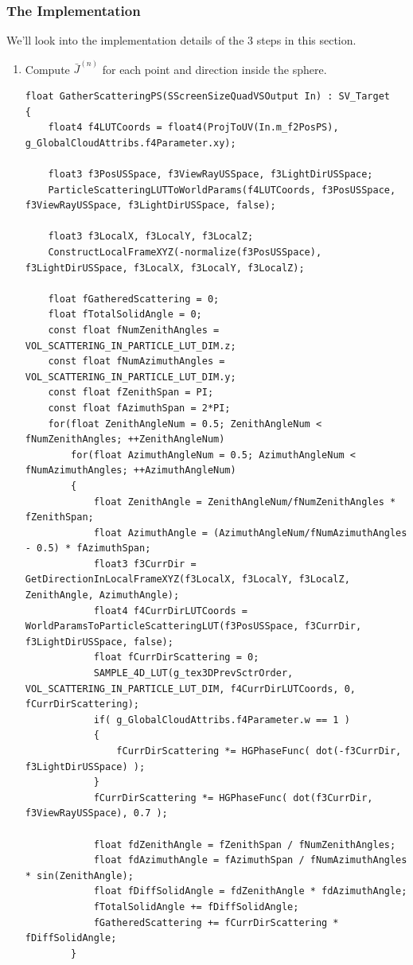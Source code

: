 \subsubsection{The Implementation}
We'll look into the implementation details of the 3 steps in this section.
\begin{enumerate}
\item Compute $\bar{J}^{(n)}$ for each point and direction inside the sphere.
\begin{lstlisting}
float GatherScatteringPS(SScreenSizeQuadVSOutput In) : SV_Target
{
    float4 f4LUTCoords = float4(ProjToUV(In.m_f2PosPS), g_GlobalCloudAttribs.f4Parameter.xy);

    float3 f3PosUSSpace, f3ViewRayUSSpace, f3LightDirUSSpace;
    ParticleScatteringLUTToWorldParams(f4LUTCoords, f3PosUSSpace, f3ViewRayUSSpace, f3LightDirUSSpace, false);

    float3 f3LocalX, f3LocalY, f3LocalZ;
    ConstructLocalFrameXYZ(-normalize(f3PosUSSpace), f3LightDirUSSpace, f3LocalX, f3LocalY, f3LocalZ);

    float fGatheredScattering = 0;
    float fTotalSolidAngle = 0;
    const float fNumZenithAngles = VOL_SCATTERING_IN_PARTICLE_LUT_DIM.z;
    const float fNumAzimuthAngles = VOL_SCATTERING_IN_PARTICLE_LUT_DIM.y;
    const float fZenithSpan = PI;
    const float fAzimuthSpan = 2*PI;
    for(float ZenithAngleNum = 0.5; ZenithAngleNum < fNumZenithAngles; ++ZenithAngleNum)
        for(float AzimuthAngleNum = 0.5; AzimuthAngleNum < fNumAzimuthAngles; ++AzimuthAngleNum)
        {
            float ZenithAngle = ZenithAngleNum/fNumZenithAngles * fZenithSpan;
            float AzimuthAngle = (AzimuthAngleNum/fNumAzimuthAngles - 0.5) * fAzimuthSpan;
            float3 f3CurrDir = GetDirectionInLocalFrameXYZ(f3LocalX, f3LocalY, f3LocalZ, ZenithAngle, AzimuthAngle);
            float4 f4CurrDirLUTCoords = WorldParamsToParticleScatteringLUT(f3PosUSSpace, f3CurrDir, f3LightDirUSSpace, false);
            float fCurrDirScattering = 0;
            SAMPLE_4D_LUT(g_tex3DPrevSctrOrder, VOL_SCATTERING_IN_PARTICLE_LUT_DIM, f4CurrDirLUTCoords, 0, fCurrDirScattering);
            if( g_GlobalCloudAttribs.f4Parameter.w == 1 )
            {
                fCurrDirScattering *= HGPhaseFunc( dot(-f3CurrDir, f3LightDirUSSpace) );
            }
            fCurrDirScattering *= HGPhaseFunc( dot(f3CurrDir, f3ViewRayUSSpace), 0.7 );

            float fdZenithAngle = fZenithSpan / fNumZenithAngles;
            float fdAzimuthAngle = fAzimuthSpan / fNumAzimuthAngles * sin(ZenithAngle);
            float fDiffSolidAngle = fdZenithAngle * fdAzimuthAngle;
            fTotalSolidAngle += fDiffSolidAngle;
            fGatheredScattering += fCurrDirScattering * fDiffSolidAngle;
        }
    

\end{lstlisting}
\end{enumerate}
